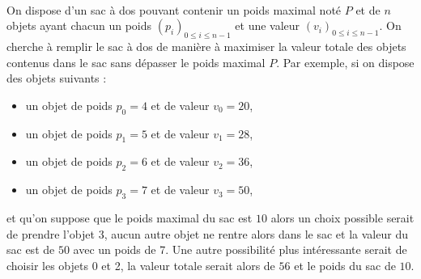 \documentclass[11pt,a4paper]{article}
\begin{document}
\begin{Exercise}[title = {Permutation des éléments d'une liste}]
\end{Exercise}


\begin{Exercise}[title={Problème du sac à dos}]\\
	On dispose d'un sac à dos pouvant contenir un poids maximal noté $P$ et de $n$ objets ayant chacun un poids $\left(p_i\right)_{0\leqslant i \leqslant n-1}$ et une valeur $\left(v_i\right)_{0\leqslant i \leqslant n-1}$. On cherche à remplir le sac à dos de manière à maximiser la valeur totale des objets contenus dans le sac sans dépasser le poids maximal $P$.
	Par exemple, si on dispose des objets suivants :
	\begin{itemize}
		\item un objet de poids $p_0 = 4$ et de valeur $v_0 = 20$,
		\item un objet de poids $p_1 = 5$ et de valeur $v_1 = 28$,
		\item un objet de poids $p_2 = 6$ et de valeur $v_2 = 36$,
		\item un objet de poids $p_3 = 7$ et de valeur $v_3 = 50$,
	\end{itemize}
	et qu'on suppose que le poids maximal du sac est $10$ alors un choix possible serait de prendre l'objet 3, aucun autre objet ne rentre alors dans le sac et la valeur du sac est  de $50$ avec un poids de 7. Une autre possibilité plus intéressante serait de choisir les objets 0  et 2, la valeur totale serait alors de $56$ et le poids du sac de $10$.\smallskip


\end{Exercise}
\end{document}
